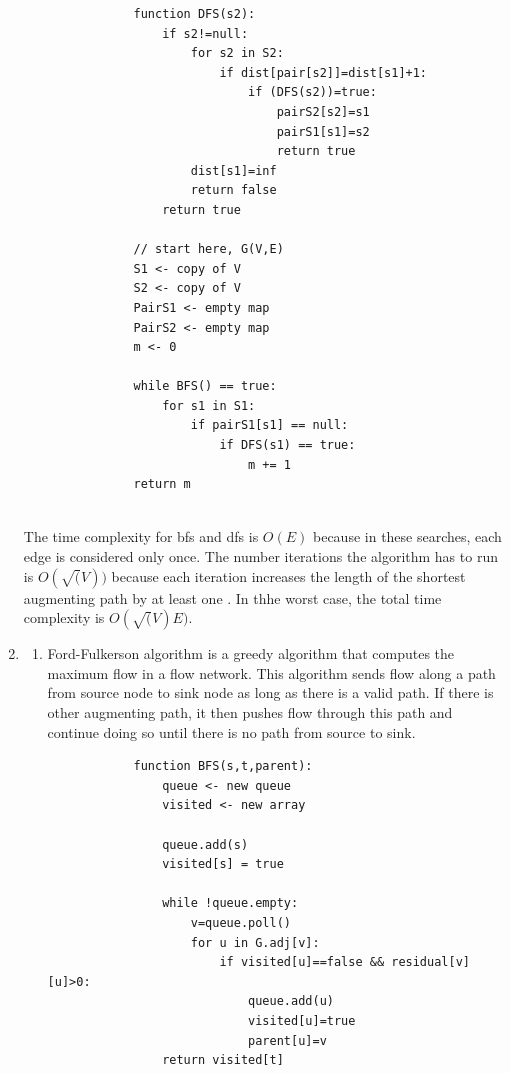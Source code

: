 \documentclass{article}
\begin{document}
\begin{enumerate}
\begin{enumerate}
\begin{lstlisting}
            function DFS(s2):
                if s2!=null:
                    for s2 in S2:
                        if dist[pair[s2]]=dist[s1]+1:
                            if (DFS(s2))=true:
                                pairS2[s2]=s1
                                pairS1[s1]=s2
                                return true
                    dist[s1]=inf
                    return false
                return true
    
            // start here, G(V,E)
            S1 <- copy of V
            S2 <- copy of V
            PairS1 <- empty map
            PairS2 <- empty map
            m <- 0
    
            while BFS() == true:
                for s1 in S1:
                    if pairS1[s1] == null:
                        if DFS(s1) == true:
                            m += 1
            return m
    
        \end{lstlisting}
    \end{enumerate}

    The time complexity for bfs and dfs is $O(E)$ because in these searches, each edge is considered only once.
    The number iterations the algorithm has to run is $O(\sqrt(V))$ because each iteration increases the length of the shortest augmenting path by at least one \cite{wiki}.
    In thhe worst case, the total time complexity is $O(\sqrt(V)E)$.

    \item
    \begin{enumerate}
        \item Ford-Fulkerson algorithm is a greedy algorithm that computes the maximum flow in a flow network\cite{wiki2}.
        This algorithm sends flow along a path from source node to sink node as long as there is a valid path.
        If there is other augmenting path, it then pushes flow through this path and continue doing so until there is no path from source to sink.
    
        \begin{lstlisting}
            function BFS(s,t,parent):
                queue <- new queue
                visited <- new array
    
                queue.add(s)
                visited[s] = true
    
                while !queue.empty:
                    v=queue.poll()
                    for u in G.adj[v]:
                        if visited[u]==false && residual[v][u]>0:
                            queue.add(u)
                            visited[u]=true
                            parent[u]=v
                return visited[t]
            

\end{lstlisting}
\end{enumerate}
\end{enumerate}
\end{document}
